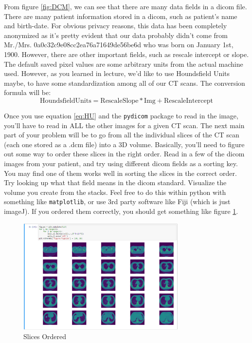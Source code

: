 \documentclass[10pt]{article}
\begin{document}
From figure \ref{fig:DCM}, we can see that there are many data fields in a dicom file.  There are many patient information stored in a dicom, such as patient's name and birth-date.  For obvious privacy reasons, this data has been completely anonymized as it's pretty evident that our data probably didn't come from Mr./Mrs. 0a0c32c9e08cc2ea76a71649de56be6d who was born on January 1st, 1900.  However, there are other important fields, such as rescale intercept or slope.  The default saved pixel values are some arbitrary units from the actual machine used.  However, as you learned in lecture, we'd like to use Houndsfield Units maybe, to have some standardization among all of our CT scans.  The conversion formula will be:
\begin{equation}\label{eq:HU}
\text{HoundsfieldUnits} = \text{RescaleSlope} * \text{Img} + \text{RescaleIntercept}
\end{equation}

\indent Once you use equation \ref{eq:HU} and the \texttt{pydicom} package to read in the image, you'll have to read in ALL the other images for a given CT scan.  The next main part of your problem will be to go from all the individual slices of the CT scan (each one stored as a .dcm file) into a 3D volume.  Basically, you'll need to figure out some way to order these slices in the right order.  Read in a few of the dicom images from your patient, and try using different dicom fields as a sorting key.  You may find one of them works well in sorting the slices in the correct order.  Try looking up what that field means in the dicom standard.  Visualize the volume you create from the stacks.  Feel free to do this within python with something like \texttt{matplotlib}, or use 3rd party software like Fiji (which is just imageJ).  If you ordered them correctly, you should get something like figure \ref{fig:order}.
\begin{figure}[h]
	\centering
	\includegraphics[width = 0.75\textwidth]{figures/lung_order}
	\caption{Slices Ordered}
	\label{fig:order}
\end{figure}\\
\end{document}

